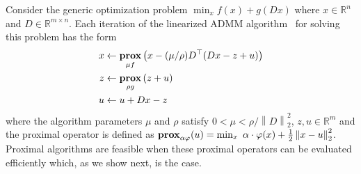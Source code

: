\documentclass[letterpaper]{article} %
\newcommand{\autoref}{\Cref}
\newcommand{\norm}[1]{\left\lVert #1 \right\rVert}
\DeclareMathOperator*{\prox}{\bf prox}
\begin{document}
Consider the generic optimization problem
$\min_x f(x)+g(Dx)$
where $x\in \mathbb{R}^n$ and $D\in \mathbb{R}^{m\times n}$. Each
iteration of the linearized ADMM
algorithm~\cite{parikh_proximal_2014} for solving this problem 
has the form
\begin{equation*}
  \label{eq:linADMM_steps}
  \begin{aligned}
    x & \leftarrow \prox_{\mu f} \left(x - (\mu/\rho)D^\top (D x - z + u )\right)\\
    z & \leftarrow \prox_{\rho g} \left(z + u\right)\\
    u & \leftarrow u + D x - z
  \end{aligned}
\end{equation*}
where the algorithm parameters $\mu$ and $\rho$ satisfy $0 < \mu <
\rho/\norm{D}_2^2$, $z,u\in \mathbb{R}^m$ and the proximal operator is
defined as $\prox_{\alpha \varphi}(u) = \min_x \,\, \alpha \cdot
\varphi(x)+\frac{1}{2} \norm{ x-u}_2^2$. Proximal algorithms are feasible
when these proximal operators can be evaluated efficiently which, as
we show next, is the case.  

 
\end{document}
